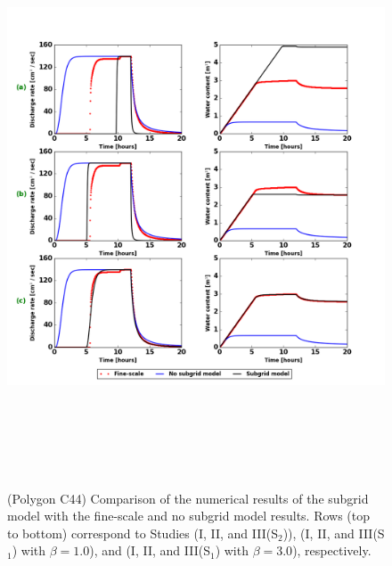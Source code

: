 \documentclass[review,11pt]{elsarticle}
\begin{document}
\begin{figure}
\centering
\includegraphics[width=13.cm, height=17.2cm]{./figures/new-model/POLYGON44-combined.png}
\caption{(Polygon C44) Comparison of the numerical results of the subgrid model with the fine-scale and no subgrid model results. Rows (top to bottom) correspond to Studies (I, II, and III(S$_2$)), (I, II, and III(S$_1$) with $\beta = 1.0$), and (I, II, and III(S$_1$) with $\beta = 3.0$), respectively.}
\label{polygon-C44}
\end{figure}
\end{document}
